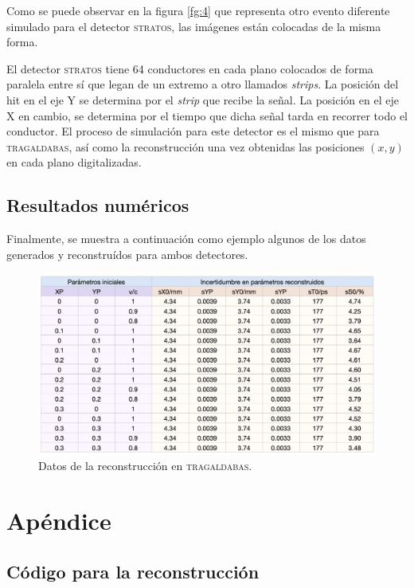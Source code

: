 \documentclass[a4paper]{article}
\begin{document}
Como se puede observar en la figura \ref{fg:4} que representa otro evento diferente simulado para el detector \textsc{stratos}, las imágenes están colocadas de la misma forma.

El detector \textsc{stratos} tiene 64 conductores en cada plano colocados de forma paralela entre sí que legan de un extremo a otro llamados \textit{strips}. La posición del hit en el eje Y se determina por el \textit{strip} que recibe la señal. La posición en el eje X en cambio, se determina por el tiempo que dicha señal tarda en recorrer todo el conductor. El proceso de simulación para este detector es el mismo que para \textsc{tragaldabas}, así como la reconstrucción una vez obtenidas las posiciones $(x, y)$ en cada plano digitalizadas.

\subsection{Resultados numéricos}

Finalmente, se muestra a continuación como ejemplo algunos de los datos generados y reconstruídos para ambos detectores.

\begin{figure}[H] 
  \centering
  \includegraphics[width=\linewidth]{tabla_parametros.png} 
  \caption{Datos de la reconstrucción en \textsc{tragaldabas}.}
  \label{fg:datos_tragas} 
\end{figure}


\section{Apéndice}

\subsection{Código para la reconstrucción}
\end{document}
